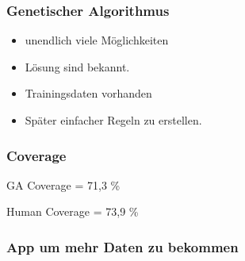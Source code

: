 
\begin{frame}
    \frametitle{Genetischer Algorithmus}
    \begin{itemize}
      \item unendlich viele Möglichkeiten
      \item Lösung sind bekannt.
      \item Trainingsdaten vorhanden
      \item Später einfacher Regeln zu erstellen.
    \end{itemize}
\end{frame}


\begin{frame}
  \frametitle{Coverage}
  \begin{center}
  \huge{GA Coverage = 71,3 \%}
  \end{center}
  \begin{center}
  \huge{Human Coverage = 73,9 \%}
  \end{center}
\end{frame}

\begin{frame}
    \frametitle{App um mehr Daten zu bekommen}
\end{frame}
